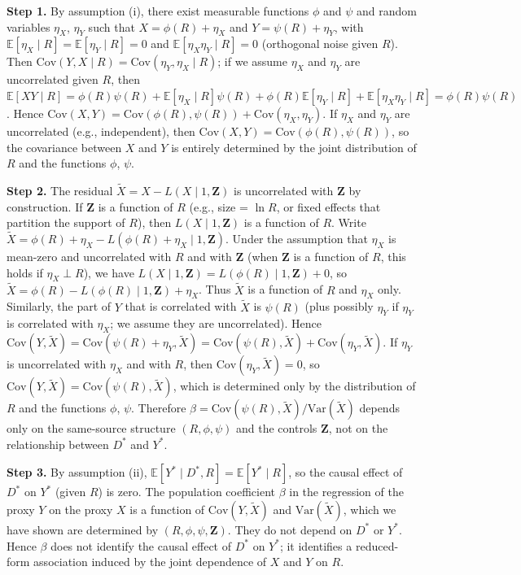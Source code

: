 \textbf{Step 1.} By assumption (i), there exist measurable functions $\phi$ and $\psi$ and random variables $\eta_X$, $\eta_Y$ such that $X = \phi(R) + \eta_X$ and $Y = \psi(R) + \eta_Y$, with $\mathbb{E}[\eta_X \mid R] = \mathbb{E}[\eta_Y \mid R] = 0$ and $\mathbb{E}[\eta_X \eta_Y \mid R] = 0$ (orthogonal noise given $R$). Then $\mathrm{Cov}(Y, X \mid R) = \mathrm{Cov}(\eta_Y, \eta_X \mid R)$; if we assume $\eta_X$ and $\eta_Y$ are uncorrelated given $R$, then $\mathbb{E}[XY \mid R] = \phi(R)\psi(R) + \mathbb{E}[\eta_X\mid R]\psi(R) + \phi(R)\mathbb{E}[\eta_Y\mid R] + \mathbb{E}[\eta_X\eta_Y\mid R] = \phi(R)\psi(R)$. Hence $\mathrm{Cov}(X, Y) = \mathrm{Cov}(\phi(R), \psi(R)) + \mathrm{Cov}(\eta_X, \eta_Y)$. If $\eta_X$ and $\eta_Y$ are uncorrelated (e.g., independent), then $\mathrm{Cov}(X, Y) = \mathrm{Cov}(\phi(R), \psi(R))$, so the covariance between $X$ and $Y$ is entirely determined by the joint distribution of $R$ and the functions $\phi$, $\psi$.

\textbf{Step 2.} The residual $\tilde{X} = X - L(X \mid 1, \mathbf{Z})$ is uncorrelated with $\mathbf{Z}$ by construction. If $\mathbf{Z}$ is a function of $R$ (e.g., size = $\ln R$, or fixed effects that partition the support of $R$), then $L(X \mid 1, \mathbf{Z})$ is a function of $R$. Write $\tilde{X} = \phi(R) + \eta_X - L(\phi(R) + \eta_X \mid 1, \mathbf{Z})$. Under the assumption that $\eta_X$ is mean-zero and uncorrelated with $R$ and with $\mathbf{Z}$ (when $\mathbf{Z}$ is a function of $R$, this holds if $\eta_X \perp R$), we have $L(X \mid 1, \mathbf{Z}) = L(\phi(R) \mid 1, \mathbf{Z}) + 0$, so $\tilde{X} = \phi(R) - L(\phi(R) \mid 1, \mathbf{Z}) + \eta_X$. Thus $\tilde{X}$ is a function of $R$ and $\eta_X$ only. Similarly, the part of $Y$ that is correlated with $\tilde{X}$ is $\psi(R)$ (plus possibly $\eta_Y$ if $\eta_Y$ is correlated with $\eta_X$; we assume they are uncorrelated). Hence $\mathrm{Cov}(Y, \tilde{X}) = \mathrm{Cov}(\psi(R) + \eta_Y, \tilde{X}) = \mathrm{Cov}(\psi(R), \tilde{X}) + \mathrm{Cov}(\eta_Y, \tilde{X})$. If $\eta_Y$ is uncorrelated with $\eta_X$ and with $R$, then $\mathrm{Cov}(\eta_Y, \tilde{X}) = 0$, so $\mathrm{Cov}(Y, \tilde{X}) = \mathrm{Cov}(\psi(R), \tilde{X})$, which is determined only by the distribution of $R$ and the functions $\phi$, $\psi$. Therefore $\beta = \mathrm{Cov}(\psi(R), \tilde{X}) / \mathrm{Var}(\tilde{X})$ depends only on the same-source structure $(R, \phi, \psi)$ and the controls $\mathbf{Z}$, not on the relationship between $D^*$ and $Y^*$.

\textbf{Step 3.} By assumption (ii), $\mathbb{E}[Y^* \mid D^*, R] = \mathbb{E}[Y^* \mid R]$, so the causal effect of $D^*$ on $Y^*$ (given $R$) is zero. The population coefficient $\beta$ in the regression of the proxy $Y$ on the proxy $X$ is a function of $\mathrm{Cov}(Y, \tilde{X})$ and $\mathrm{Var}(\tilde{X})$, which we have shown are determined by $(R, \phi, \psi, \mathbf{Z})$. They do not depend on $D^*$ or $Y^*$. Hence $\beta$ does not identify the causal effect of $D^*$ on $Y^*$; it identifies a reduced-form association induced by the joint dependence of $X$ and $Y$ on $R$.


